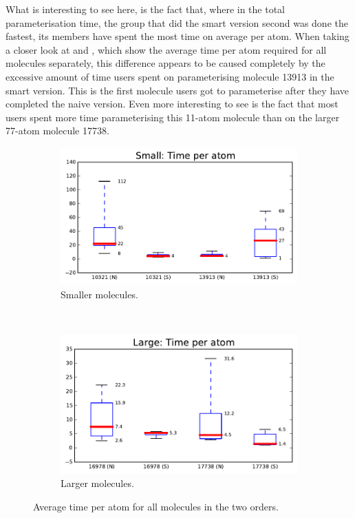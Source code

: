 What is interesting to see here, is the fact that, where in the total parameterisation time, the group that did the smart version second was done the fastest, its members have spent the most time on average per atom. When taking a closer look at  and , which show the average time per atom required for all molecules separately, this difference appears to be caused completely by the excessive amount of time users spent on parameterising molecule 13913 in the smart version. This is the first molecule users got to parameterise after they have completed the naive version. Even more interesting to see is the fact that most users spent more time parameterising this 11-atom molecule than on the larger 77-atom molecule 17738.

\begin{figure}[h!]
\centering
\begin{subfigure}[t]{0.48\textwidth}
\centering
\includegraphics[width=\textwidth]{img/graphs/1c_03.pdf}
\caption{Smaller molecules.}
\end{subfigure}%
~
\begin{subfigure}[t]{0.48\textwidth}
\centering
\includegraphics[width=\textwidth]{img/graphs/1d_03.pdf}
\caption{Larger molecules.}
\end{subfigure}
\caption{Average time per atom for all molecules in the two orders.}
\end{figure}

